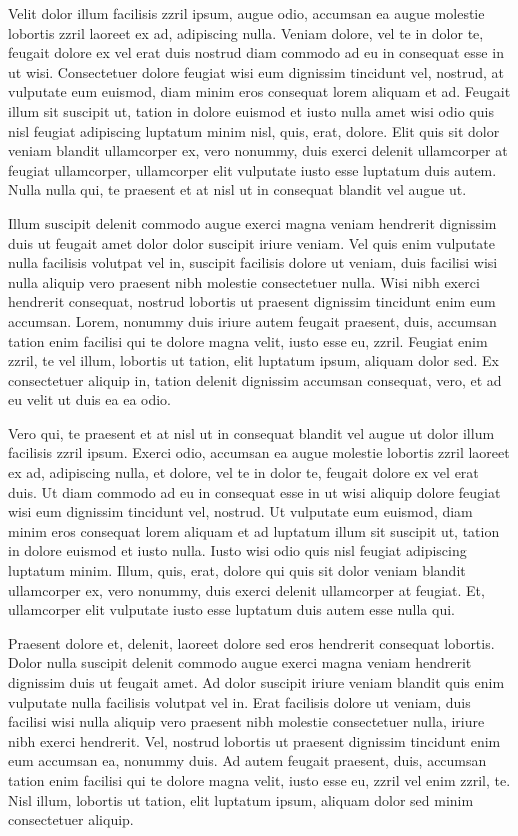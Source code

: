 \documentclass[letterpaper,12pt,titlepage,oneside,final]{book}
\begin{document}
Velit dolor illum facilisis zzril ipsum, augue odio, accumsan ea augue molestie lobortis zzril laoreet ex ad, adipiscing nulla. Veniam dolore, vel te in dolor te, feugait dolore ex vel erat duis nostrud diam commodo ad eu in consequat esse in ut wisi. Consectetuer dolore feugiat wisi eum dignissim tincidunt vel, nostrud, at vulputate eum euismod, diam minim eros consequat lorem aliquam et ad. Feugait illum sit suscipit ut, tation in dolore euismod et iusto nulla amet wisi odio quis nisl feugiat adipiscing luptatum minim nisl, quis, erat, dolore. Elit quis sit dolor veniam blandit ullamcorper ex, vero nonummy, duis exerci delenit ullamcorper at feugiat ullamcorper, ullamcorper elit vulputate iusto esse luptatum duis autem. Nulla nulla qui, te praesent et at nisl ut in consequat blandit vel augue ut.

Illum suscipit delenit commodo augue exerci magna veniam hendrerit dignissim duis ut feugait amet dolor dolor suscipit iriure veniam. Vel quis enim vulputate nulla facilisis volutpat vel in, suscipit facilisis dolore ut veniam, duis facilisi wisi nulla aliquip vero praesent nibh molestie consectetuer nulla. Wisi nibh exerci hendrerit consequat, nostrud lobortis ut praesent dignissim tincidunt enim eum accumsan. Lorem, nonummy duis iriure autem feugait praesent, duis, accumsan tation enim facilisi qui te dolore magna velit, iusto esse eu, zzril. Feugiat enim zzril, te vel illum, lobortis ut tation, elit luptatum ipsum, aliquam dolor sed. Ex consectetuer aliquip in, tation delenit dignissim accumsan consequat, vero, et ad eu velit ut duis ea ea odio.

Vero qui, te praesent et at nisl ut in consequat blandit vel augue ut dolor illum facilisis zzril ipsum. Exerci odio, accumsan ea augue molestie lobortis zzril laoreet ex ad, adipiscing nulla, et dolore, vel te in dolor te, feugait dolore ex vel erat duis. Ut diam commodo ad eu in consequat esse in ut wisi aliquip dolore feugiat wisi eum dignissim tincidunt vel, nostrud. Ut vulputate eum euismod, diam minim eros consequat lorem aliquam et ad luptatum illum sit suscipit ut, tation in dolore euismod et iusto nulla. Iusto wisi odio quis nisl feugiat adipiscing luptatum minim. Illum, quis, erat, dolore qui quis sit dolor veniam blandit ullamcorper ex, vero nonummy, duis exerci delenit ullamcorper at feugiat. Et, ullamcorper elit vulputate iusto esse luptatum duis autem esse nulla qui.

Praesent dolore et, delenit, laoreet dolore sed eros hendrerit consequat lobortis. Dolor nulla suscipit delenit commodo augue exerci magna veniam hendrerit dignissim duis ut feugait amet. Ad dolor suscipit iriure veniam blandit quis enim vulputate nulla facilisis volutpat vel in. Erat facilisis dolore ut veniam, duis facilisi wisi nulla aliquip vero praesent nibh molestie consectetuer nulla, iriure nibh exerci hendrerit. Vel, nostrud lobortis ut praesent dignissim tincidunt enim eum accumsan ea, nonummy duis. Ad autem feugait praesent, duis, accumsan tation enim facilisi qui te dolore magna velit, iusto esse eu, zzril vel enim zzril, te. Nisl illum, lobortis ut tation, elit luptatum ipsum, aliquam dolor sed minim consectetuer aliquip.
\end{document}
